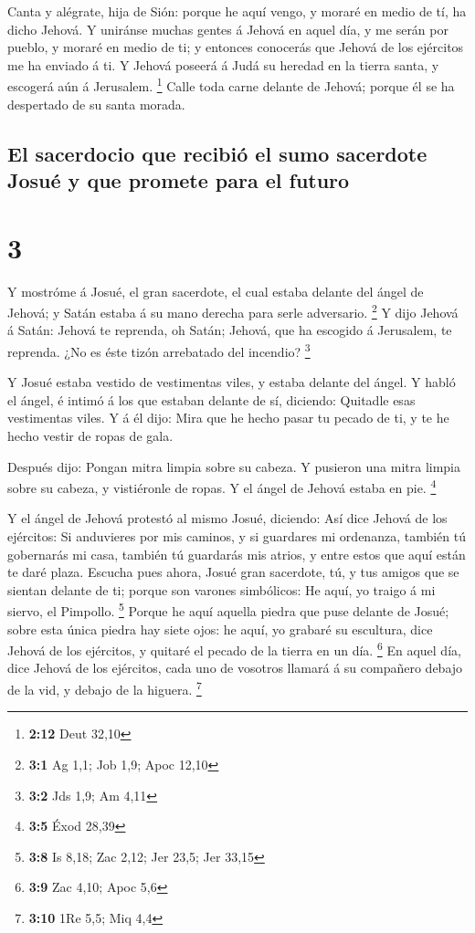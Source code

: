  Canta y alégrate, hija de Sión: porque he aquí vengo, y
moraré en medio de tí, ha dicho Jehová.  Y uniránse
muchas gentes á Jehová en aquel día, y me serán por pueblo, y moraré en
medio de ti; y entonces conocerás que Jehová de los ejércitos me ha
enviado á ti.  Y Jehová poseerá á Judá su heredad en la
tierra santa, y escogerá aún á Jerusalem. \footnote{\textbf{2:12} Deut
  32,10}  Calle toda carne delante de Jehová; porque él
se ha despertado de su santa morada.

\hypertarget{el-sacerdocio-que-recibiuxf3-el-sumo-sacerdote-josuuxe9-y-que-promete-para-el-futuro}{%
\subsection{El sacerdocio que recibió el sumo sacerdote Josué y que
promete para el
futuro}\label{el-sacerdocio-que-recibiuxf3-el-sumo-sacerdote-josuuxe9-y-que-promete-para-el-futuro}}

\hypertarget{section-2}{%
\section{3}\label{section-2}}

 Y mostróme á Josué, el gran sacerdote, el cual estaba
delante del ángel de Jehová; y Satán estaba á su mano derecha para serle
adversario. \footnote{\textbf{3:1} Ag 1,1; Job 1,9; Apoc 12,10}
 Y dijo Jehová á Satán: Jehová te reprenda, oh Satán;
Jehová, que ha escogido á Jerusalem, te reprenda. ¿No es éste tizón
arrebatado del incendio? \footnote{\textbf{3:2} Jds 1,9; Am 4,11}

 Y Josué estaba vestido de vestimentas viles, y estaba
delante del ángel.  Y habló el ángel, é intimó á los que
estaban delante de sí, diciendo: Quitadle esas vestimentas viles. Y á él
dijo: Mira que he hecho pasar tu pecado de ti, y te he hecho vestir de
ropas de gala.

 Después dijo: Pongan mitra limpia sobre su cabeza. Y
pusieron una mitra limpia sobre su cabeza, y vistiéronle de ropas. Y el
ángel de Jehová estaba en pie. \footnote{\textbf{3:5} Éxod 28,39}

 Y el ángel de Jehová protestó al mismo Josué, diciendo:
 Así dice Jehová de los ejércitos: Si anduvieres por mis
caminos, y si guardares mi ordenanza, también tú gobernarás mi casa,
también tú guardarás mis atrios, y entre estos que aquí están te daré
plaza.  Escucha pues ahora, Josué gran sacerdote, tú, y
tus amigos que se sientan delante de ti; porque son varones simbólicos:
He aquí, yo traigo á mi siervo, el Pimpollo. \footnote{\textbf{3:8} Is
  8,18; Zac 2,12; Jer 23,5; Jer 33,15}  Porque he aquí
aquella piedra que puse delante de Josué; sobre esta única piedra hay
siete ojos: he aquí, yo grabaré su escultura, dice Jehová de los
ejércitos, y quitaré el pecado de la tierra en un día. \footnote{\textbf{3:9}
  Zac 4,10; Apoc 5,6}  En aquel día, dice Jehová de los
ejércitos, cada uno de vosotros llamará á su compañero debajo de la vid,
y debajo de la higuera. \footnote{\textbf{3:10} 1Re 5,5; Miq 4,4}

